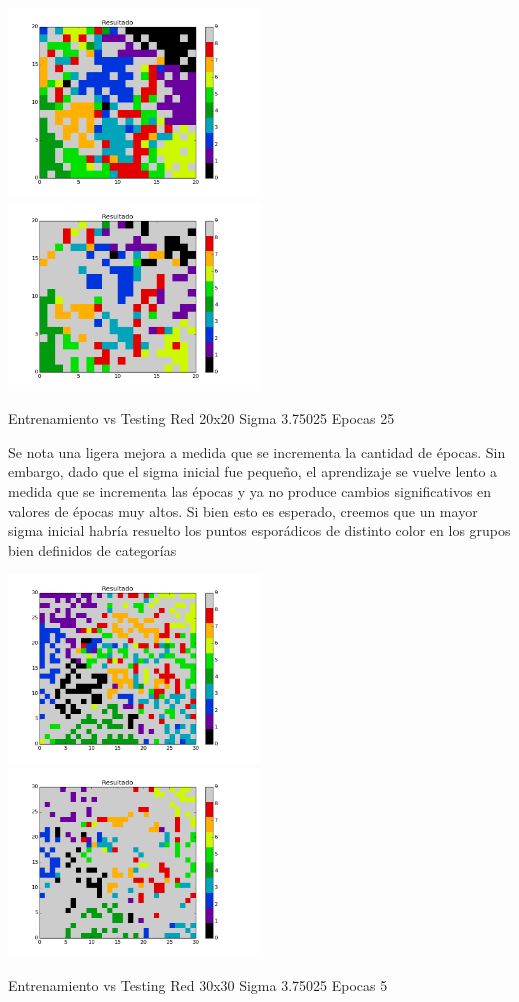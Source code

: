 \includegraphics[width=0.5\textwidth]{img/Ej2_Epocas/train_M_20_sigma_3_75025_epocas_25}
\includegraphics[width=0.5\textwidth]{img/Ej2_Epocas/test_M_20_sigma_3_75025_epocas_25}
{\center \footnotesize Entrenamiento vs Testing Red 20x20 Sigma 3.75025 Epocas 25\par}

Se nota una ligera mejora a medida que se incrementa la cantidad de \'epocas. Sin embargo, dado que el sigma inicial fue pequeño, el aprendizaje se vuelve lento a medida que se incrementa las \'epocas y ya no produce cambios significativos en valores de \'epocas muy altos. Si bien esto es esperado, creemos que un mayor sigma inicial habr\'ia resuelto los puntos espor\'adicos de distinto color en los grupos bien definidos de categor\'ias

\includegraphics[width=0.5\textwidth]{img/Ej2_Epocas/train_M_30_sigma_3_75025_epocas_5}
\includegraphics[width=0.5\textwidth]{img/Ej2_Epocas/test_M_30_sigma_3_75025_epocas_5}
{\center \footnotesize Entrenamiento vs Testing Red 30x30 Sigma 3.75025 Epocas 5\par}

